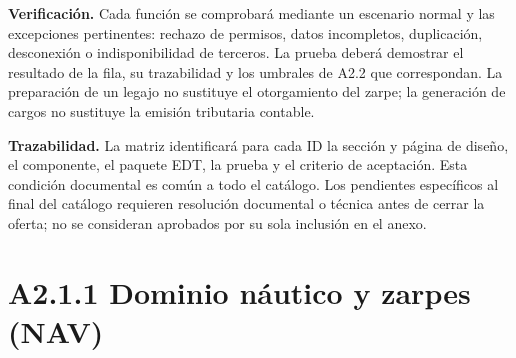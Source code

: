 \textbf{Verificación.} Cada función se comprobará mediante un escenario
normal y las excepciones pertinentes: rechazo de permisos, datos incompletos,
duplicación, desconexión o indisponibilidad de terceros. La prueba deberá
demostrar el resultado de la fila, su trazabilidad y los umbrales de A2.2 que
correspondan. La preparación de un legajo no sustituye el otorgamiento del
zarpe; la generación de cargos no sustituye la emisión tributaria contable.

\textbf{Trazabilidad.} La matriz identificará para cada ID la sección y
página de diseño, el componente, el paquete EDT, la prueba y el criterio de
aceptación. Esta condición documental es común a todo el catálogo. Los pendientes específicos al final del catálogo requieren
resolución documental o técnica antes de cerrar la oferta; no se consideran
aprobados por su sola inclusión en el anexo.
\clearpage\section*{A2.1.1 Dominio náutico y zarpes (NAV)}


